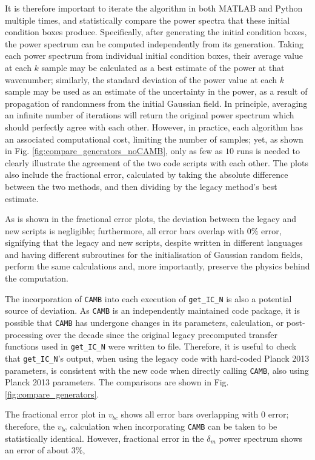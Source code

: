 \documentclass[floats,floatfix,showpacs,amssymb,prd,superscriptaddress,nofootinbib, 11pt]{revtex4-2} %
\newcommand{\code}{\texttt}
\begin{document}
It is therefore important to iterate the algorithm in both MATLAB and Python multiple times, and statistically compare the power spectra that these initial condition boxes produce. Specifically, after generating the initial condition boxes, the power spectrum can be computed independently from its generation. Taking each power spectrum from individual initial condition boxes, their average value at each $k$ sample may be calculated as a best estimate of the power at that wavenumber; similarly, the standard deviation of the power value at each $k$ sample may be used as an estimate of the uncertainty in the power, as a result of propagation of randomness from the initial Gaussian field. In principle, averaging an infinite number of iterations will return the original power spectrum which should perfectly agree with each other. However, in practice, each algorithm has an associated computational cost, limiting the number of samples; yet, as shown in Fig. \ref{fig:compare_generators_noCAMB}, only as few as $10$ runs is needed to clearly illustrate the agreement of the two code scripts with each other. The plots also include the fractional error, calculated by taking the absolute difference between the two methods, and then dividing by the legacy method's best estimate.

As is shown in the fractional error plots, the deviation between the legacy and new scripts is negligible; furthermore, all error bars overlap with $0 \%$ error, signifying that the legacy and new scripts, despite written in different languages and having different subroutines for the initialisation of Gaussian random fields, perform the same calculations and, more importantly, preserve the physics behind the computation.

The incorporation of \code{CAMB} into each execution of \code{get\_IC\_N} is also a potential source of deviation. As \code{CAMB} is an independently maintained code package, it is possible that \code{CAMB} has undergone changes in its parameters, calculation, or post-processing over the decade since the original legacy precomputed transfer functions used in \code{get\_IC\_N} were written to file. Therefore, it is useful to check that \code{get\_IC\_N}'s output, when using the legacy code with hard-coded Planck 2013 parameters, is consistent with the new code when directly calling \code{CAMB}, also using Planck 2013 parameters. The comparisons are shown in Fig. \ref{fig:compare_generators}.

The fractional error plot in $v_{bc}$ shows all error bars overlapping with $0$ error; therefore, the $v_{bc}$ calculation when incorporating \code{CAMB} can be taken to be statistically identical. However, fractional error in the $\delta_m$ power spectrum shows an error of about $3 \%$, 
\end{document}
